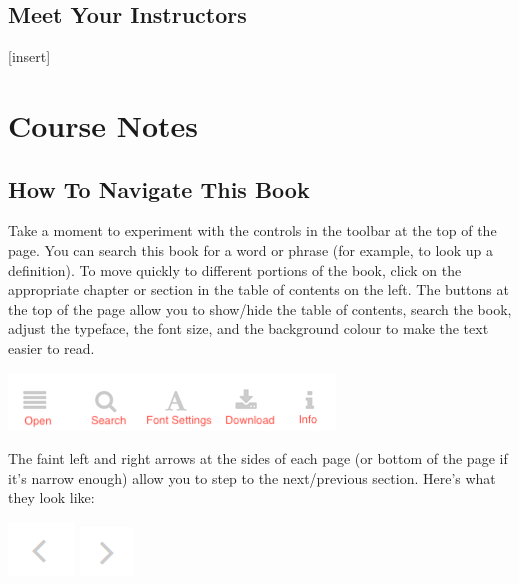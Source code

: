\documentclass[
]{book}
\theoremstyle{definition}
\theoremstyle{definition}
\theoremstyle{definition}
\theoremstyle{definition}
\theoremstyle{remark}
\begin{document}
\hypertarget{meet-your-instructors}{%
\subsection*{Meet Your Instructors}\label{meet-your-instructors}}

{[}insert{]}

\hypertarget{course-notes}{%
\section*{Course Notes}\label{course-notes}}

\hypertarget{how-to-navigate-this-book}{%
\subsection*{How To Navigate This Book}\label{how-to-navigate-this-book}}

Take a moment to experiment with the controls in the toolbar at the top of the page. You can search this book for a word or phrase (for example, to look up a definition). To move quickly to different portions of the book, click on the appropriate chapter or section in the table of contents on the left. The buttons at the top of the page allow you to show/hide the table of contents, search the book, adjust the typeface, the font size, and the background colour to make the text easier to read.

\includegraphics{assets/course-intro/menu.png}

The faint left and right arrows at the sides of each page (or bottom of the page if it's narrow enough) allow you to step to the next/previous section. Here's what they look like:

\includegraphics{assets/course-intro/left_arrow.png} \includegraphics{assets/course-intro/right_arrow.png}
\end{document}
